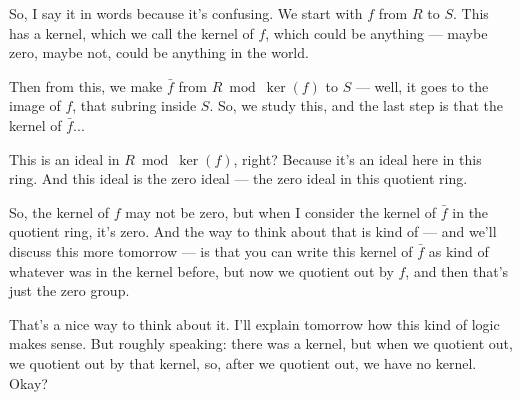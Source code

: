 \begin{speech}[01:07:47 - 01:09:13]
So, I say it in words because it's confusing. We start with $f$ from $R$ to $S$. This has a kernel, which we call the kernel of $f$,  which could be anything --- maybe zero, maybe not, could be anything in the world. 

Then from this, we make $\bar{f}$ from $R \bmod \ker(f)$ to $S$ --- well, it goes to the image of $f$, that subring inside $S$.  So, we study this, and the last step is that the kernel of $\bar{f}$... 

This is an ideal in $R \bmod \ker(f)$, right?  Because it's an ideal here in this ring. And this ideal is the zero ideal --- the zero ideal in this quotient ring.  

So, the kernel of $f$ may not be zero, but when I consider the kernel of $\bar{f}$ in the quotient ring, it's zero. And the way to think about that is kind of --- and we'll discuss this more tomorrow --- is that you can write this kernel of $\bar{f}$ as kind of whatever was in the kernel before, but now we quotient out by $f$, and then that's just the zero group.  

That's a nice way to think about it. I'll explain tomorrow how this kind of logic makes sense. But roughly speaking: there was a kernel, but when we quotient out, we quotient out by that kernel, so, after we quotient out, we have no kernel. Okay?
\end{speech}

